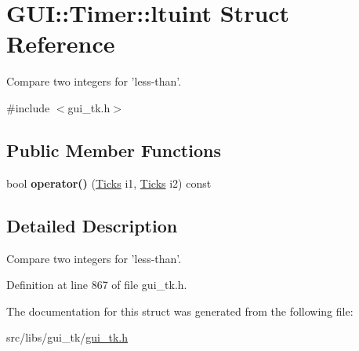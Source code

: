 \hypertarget{structGUI_1_1Timer_1_1ltuint}{\section{G\-U\-I\-:\-:Timer\-:\-:ltuint Struct Reference}
\label{structGUI_1_1Timer_1_1ltuint}
}


Compare two integers for 'less-\/than'.  




{\ttfamily \#include $<$gui\-\_\-tk.\-h$>$}

\subsection*{Public Member Functions}
\begin{DoxyCompactItemize}
\item 
\hypertarget{structGUI_1_1Timer_1_1ltuint_ac812e7336225709928959fdd35632405}{bool {\bfseries operator()} (\hyperlink{namespaceGUI_af396fee5d5c26b98218f5803f85e3b65}{Ticks} i1, \hyperlink{namespaceGUI_af396fee5d5c26b98218f5803f85e3b65}{Ticks} i2) const }\label{structGUI_1_1Timer_1_1ltuint_ac812e7336225709928959fdd35632405}

\end{DoxyCompactItemize}


\subsection{Detailed Description}
Compare two integers for 'less-\/than'. 

Definition at line 867 of file gui\-\_\-tk.\-h.



The documentation for this struct was generated from the following file\-:\begin{DoxyCompactItemize}
\item 
src/libs/gui\-\_\-tk/\hyperlink{gui__tk_8h}{gui\-\_\-tk.\-h}\end{DoxyCompactItemize}
